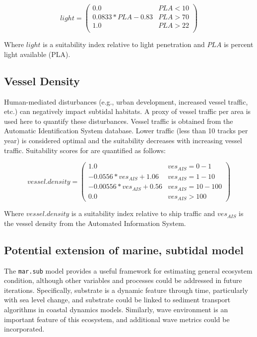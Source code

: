 \documentclass[
]{book}
\begin{document}
\[light = \begin{pmatrix} 0.0 & PLA<10\\
0.0833*PLA-0.83 & PLA>70\\
1.0 & PLA>22\\
\end{pmatrix}\]

Where \(light\) is a suitability index relative to light penetration and \(PLA\) is percent light available (PLA).

\hypertarget{vessel-density}{%
\subsection{Vessel Density}\label{vessel-density}}

Human-mediated disturbances (e.g., urban development, increased vessel traffic, etc.) can negatively impact subtidal habitats. A proxy of vessel traffic per area is used here to quantify these disturbances. Vessel traffic is obtained from the Automatic Identification System database. Lower traffic (less than 10 tracks per year) is considered optimal and the suitability decreases with increasing vessel traffic. Suitability scores for are quantified as follows:

\[vessel.density = \begin{pmatrix} 1.0 & ves_{AIS}=0-1\\
-0.0556*ves_{AIS}+1.06 & ves_{AIS}=1-10\\
-0.00556*ves_{AIS}+0.56 & ves_{AIS}=10-100\\
0.0 & ves_{AIS}>100
\end{pmatrix}\]

Where \(vessel.density\) is a suitability index relative to ship traffic and \(ves_{AIS}\) is the vessel density from the Automated Information System.

\hypertarget{potential-extension-of-marine-subtidal-model}{%
\subsection{Potential extension of marine, subtidal model}\label{potential-extension-of-marine-subtidal-model}}

The \texttt{mar.sub} model provides a useful framework for estimating general ecosystem condition, although other variables and processes could be addressed in future iterations. Specifically, substrate is a dynamic feature through time, particularly with sea level change, and substrate could be linked to sediment transport algorithms in coastal dynamics models. Similarly, wave environment is an important feature of this ecosystem, and additional wave metrics could be incorporated.
\end{document}
